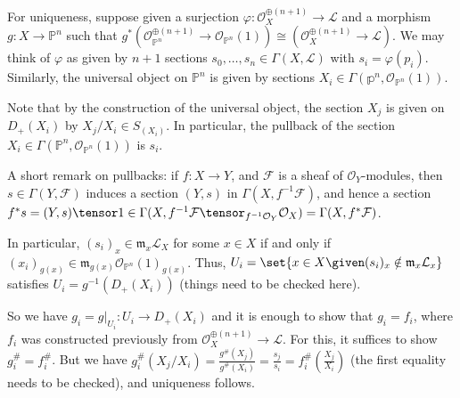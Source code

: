 For uniqueness, suppose given a surjection $\varphi\colon \mathcal{O}_X^{\oplus(n+1)} \to \mathcal{L}$
and a morphism $g\colon X\to \mathbb{P}^n$ such that $g^*(\mathcal{O}_{\mathbb{P}^n}^{\oplus(n+1)}\to \mathcal{O}_{\mathbb{P}^n}(1))\cong (\mathcal{O}_X^{\oplus(n+1)}\to \mathcal{L})$.
We may think of $\varphi$ as given by $n+1$ sections $s_0, \ldots, s_n \in\Gamma(X, \mathcal{L})$
with $s_i = \varphi(p_i)$. Similarly, the universal object on $\mathbb{P}^n$ is given
by sections $X_i \in \Gamma(\mathbb{p}^n, \mathcal{O}_{\mathbb{P}^n}(1))$.

Note that by the construction of the universal object, the section $X_j$ is
given on $D_+(X_i)$ by $X_j/X_i \in S_{(X_i)}$. In particular, the pullback of
the section $X_i \in \Gamma(\mathbb{P}^n, \mathcal{O}_{\mathbb{P}^n}(1))$ is $s_i$.

A short remark on pullbacks: if $f\colon X\to Y$, and $\mathcal{F}$ is a sheaf of
$\mathcal{O}_Y$-modules, then $s \in \Gamma(Y, \mathcal{F})$ induces a section
$(Y, s)$ in $\Gamma(X, f^{-1}\mathcal{F})$, and hence a section
$f^*s = (Y, s)\tensor 1 \in \Gamma(X, f^{-1}\mathcal{F}\tensor_{f^{-1}\mathcal{O}_Y}\mathcal{O}_X) = \Gamma(X, f^*\mathcal{F})$.

In particular, $(s_i)_x \in \mathfrak{m}_x\mathcal{L}_X$ for some $x \in X$ if and only if
$(x_i)_{g(x)} \in \mathfrak{m}_{g(x)}\mathcal{O}_{\mathbb{P}^n}(1)_{g(x)}$.
Thus, $U_i = \set{x \in X\given (s_i)_x \notin \mathfrak{m}_x\mathcal{L}_x}$ satisfies
$U_i = g^{-1}(D_+(X_i))$ (things need to be checked here).

So we have $g_i = g|_{U_i}\colon U_i\to D_+(X_i)$ and it is enough to show that
$g_i = f_i$, where $f_i$ was constructed previously from $\mathcal{O}_X^{\oplus(n+1)} \to \mathcal{L}$.
For this, it suffices to show $g_i^\# = f_i^\#$. But we have $g_i^\#(X_j/X_i) = \frac{g^\#(X_j)}{g^\#(X_i)} = \frac{s_j}{s_i} = f_i^\#(\frac{X_j}{X_i})$ (the first equality needs to be checked),
and uniqueness follows.
